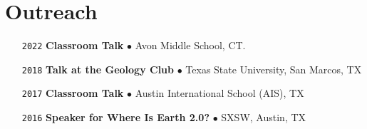 \section*{Outreach}

\begin{itemize}[leftmargin=3.8em, labelsep=1.5em]
    \setlength\itemsep{-.5em}
    \item[\texttt{2022}] 
    \textbf{Classroom Talk} $\bullet$ Avon Middle School, CT.
    \item[\texttt{2018}] \textbf{Talk at the Geology Club} $\bullet$ Texas State University, San Marcos, TX
    \item[\texttt{2017}] \textbf{Classroom Talk} $\bullet$ Austin International School (AIS), TX
    \item[\texttt{2016}] \textbf{Speaker for Where Is Earth 2.0?} $\bullet$ SXSW, Austin, TX
\end{itemize}